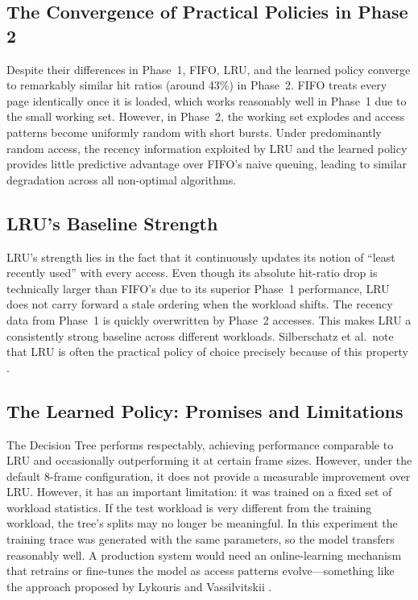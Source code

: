 \documentclass[11pt, a4paper]{article}
\begin{document}
\subsection{The Convergence of Practical Policies in Phase 2}

Despite their differences in Phase~1, FIFO, LRU, and the learned policy converge to remarkably similar hit ratios (around 43\%) in Phase~2.
FIFO treats every page identically once it is loaded, which works reasonably well in Phase~1 due to the small working set.
However, in Phase~2, the working set explodes and access patterns become uniformly random with short bursts.
Under predominantly random access, the recency information exploited by LRU and the learned policy provides little predictive advantage over FIFO's naive queuing, leading to similar degradation across all non-optimal algorithms.

\subsection{LRU's Baseline Strength}

LRU's strength lies in the fact that it continuously updates its notion of ``least recently used'' with every access.
Even though its absolute hit-ratio drop is technically larger than FIFO's due to its superior Phase~1 performance, LRU does not carry forward a stale ordering when the workload shifts. The recency data from Phase~1 is quickly overwritten by Phase~2 accesses.
This makes LRU a consistently strong baseline across different workloads. Silberschatz et al.\ note that LRU is often the practical policy of choice precisely because of this property \cite{silberschatz2018}.

\subsection{The Learned Policy: Promises and Limitations}

The Decision Tree performs respectably, achieving performance comparable to LRU and occasionally outperforming it at certain frame sizes. However, under the default 8-frame configuration, it does not provide a measurable improvement over LRU.
However, it has an important limitation: it was trained on a fixed set of workload statistics.
If the test workload is very different from the training workload, the tree's splits may no longer be meaningful.
In this experiment the training trace was generated with the same parameters, so the model transfers reasonably well.
A production system would need an online-learning mechanism that retrains or fine-tunes the model as access patterns evolve---something like the approach proposed by Lykouris and Vassilvitskii \cite{lykouris2021}.
\end{document}
